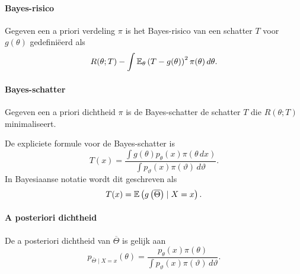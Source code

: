\paragraph{Bayes-risico} Gegeven een a priori verdeling \(\pi\) is het Bayes-risico van een schatter \(T\) voor \(g(\theta)\) gedefiniëerd als
\[
    R(\theta;T)-\int\mathbb{E}_{\theta}\left(T-g(\theta)\right)^{2}\pi(\theta)\,d\theta.
\]

\paragraph{Bayes-schatter} Gegeven een a priori dichtheid \(\pi\) is de Bayes-schatter de schatter \(T\) die \(R(\theta;T)\) minimaliseert.

De expliciete formule voor de Bayes-schatter is
\[
    T(x)=\frac{\int g(\theta)p_{\theta}(x)\pi(\theta\,dx)}{\int p_{\vartheta}(x)\pi(\vartheta)\,d\vartheta}.
\]
In Bayesiaanse notatie wordt dit geschreven als
\[
    T(x)=\mathbb{E}\left(g\left(\overline{\Theta}\right)\mid X=x\right).
\]

\paragraph{A posteriori dichtheid} De a posteriori dichtheid van \(\overline{\Theta}\) is gelijk aan
\[
    p_{\overline{\Theta}\mid X=x}(\theta)=\frac{p_{\theta}(x)\pi(\theta)}{\int p_{\vartheta}(x)\pi(\vartheta)\,d\vartheta}.
\]